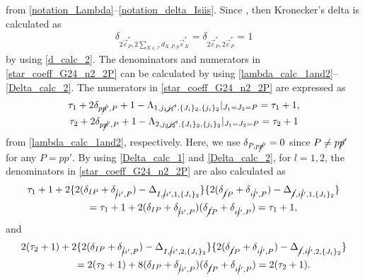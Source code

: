 \documentclass[10pt,a4paper]{amsart}
\numberwithin{equation}{section}
\begin{document}
from \eqref{notation_Lambda}--\eqref{notation_delta_Isiis}. Since
,
then Kronecker's delta is calculated as
\begin{align}
 \delta_{
 2
 \vec{e}_{P}^{\ast},
 2
 \sum_{
 X
 \in
 \mathcal{I}
 }
 d_{
 X,
 P,
 p
 }
 \vec{e}_{X}^{\ast}
 }
 =
 \delta_{
 2
 \vec{e}_{P}^{\ast},
 2
 \vec{e}_{P}^{\ast}
 }
 =
 1
 \label{K_delta_calc_2}
\end{align}
by using \eqref{d_calc_2}. The denominators and numerators in \eqref{star_coeff_G24_n2_2P} can be calculated by using \eqref{lambda_calc_1and2}--\eqref{Delta_calc_2}. The numerators in \eqref{star_coeff_G24_n2_2P} are expressed as
\begin{gather*}%
\tau_{1}
+
2
\delta_{p\cancel{p}',P}
+
1
-
\Lambda_{
1,
j_{1}\cancel{j_{1}}',
\{
J_{i}
\}_{2},
\{
j_{i}
\}_{2}
}
|_{J_{1}=J_{2}=P}
=
\tau_{1}
+
1,
\\
\tau_{2}
+
2
\delta_{p\cancel{p}',P}
+
1
-
\Lambda_{
2,
j_{2}\cancel{j_{2}}',
\{
J_{i}
\}_{2},
\{
j_{i}
\}_{2}
}
|_{J_{1}=J_{2}=P}
=
\tau_{2}
+
1
\end{gather*}
from \eqref{lambda_calc_1and2}, respectively. Here, we use
$
\delta_{
P,
p\cancel{p}'
}
=
0
$
since
$
P
\neq
p\cancel{p}'
$
for any
$
P
=
pp'
$.
By using \eqref{Delta_calc_1} and \eqref{Delta_calc_2}, for $l=1,2$, the denominators in \eqref{star_coeff_G24_n2_2P} are also calculated as
\begin{gather*}%
\tau_{1}
+
1
+
2
\{
 2
 (
 \delta_{IP}
 +
 \delta_{\cancel{i}i',P}
 )
 -
 \Delta_{
 I,
 \cancel{i}i',
 1,
 \{
 J_{i}
\}_{2}
}
\}
\{
 2
 (
 \delta_{\cancel{I}P}
 +
 \delta_{i\cancel{i}',P}
 )
 -
 \Delta_{
 \cancel{I},
 i\cancel{i}',
 1,
 \{
 J_{i}
 \}_{2}
 }
\}
\\
\qquad=
\tau_{1}
+
1
+
2
 (
 \delta_{IP}
 +
 \delta_{\cancel{i}i',P}
 )
 (
 \delta_{\cancel{I}P}
 +
 \delta_{i\cancel{i}',P}
 )
=
\tau_{1}
+
1,
\end{gather*}
and
\begin{gather}
2
 (
\tau_{2}
+
1
 )
+
2
\{
 2
 (
 \delta_{IP}
 +
 \delta_{\cancel{i}i',P}
 )
 -
 \Delta_{
 I,
 \cancel{i}i',
 2,
 \{
 J_{i}
\}_{2}
}
\}
\{
 2
 (
 \delta_{\cancel{I}P}
 +
 \delta_{i\cancel{i}',P}
 )
 -
 \Delta_{
 \cancel{I},
 i\cancel{i}',
 2,
 \{
 J_{i}
 \}_{2}
 }
\}
\nonumber
\\
\qquad=
2
 (
\tau_{2}
+
1
 )
+
8
 (
 \delta_{IP}
 +
 \delta_{\cancel{i}i',P}
 )
 (
 \delta_{\cancel{I}P}
 +
 \delta_{i\cancel{i}',P}
 )
=
2
 (
\tau_{2}
+
1
 ).
\label{denominator_2}
\end{gather}
\end{document}
